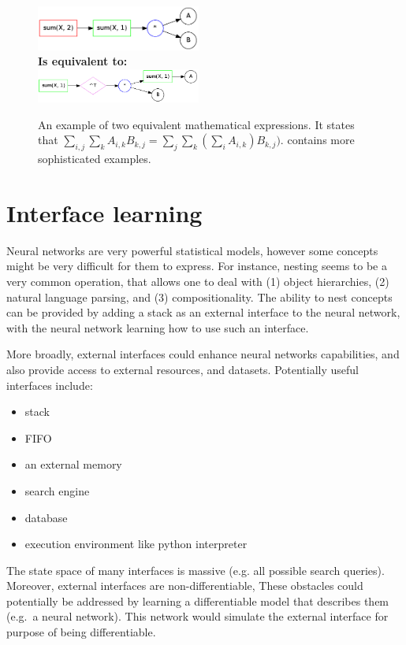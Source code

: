 \documentclass{article}
\begin{document}
\begin{figure}
  \centering
  \includegraphics[width=0.48\textwidth]{imgs/example1_brute.png}\\
  {\bf Is equivalent to:}\\
  \includegraphics[width=0.48\textwidth]{imgs/example1_opt.png}\\
  \caption{An example of two equivalent mathematical expressions. It states that
  $\sum_{i,j} \sum_k A_{i, k}B_{k, j} = \sum_{j} \sum_k (\sum_i A_{i,
    k})B_{k, j})$. \cite{zaremba2014learning} contains more sophisticated examples.}
  \label{fig:ident}
\end{figure}


\section{Interface learning}
\label{sec:interface}
Neural networks are very powerful statistical models, however some
concepts might be very difficult for them to express.  For instance,
nesting seems to be a very common operation, that allows one to deal
with (1) object hierarchies, (2) natural language parsing, and (3)
compositionality. The ability to nest concepts can be provided by
adding a stack as an external interface to the neural network, with
the neural network learning how to use such an interface.

More broadly, external interfaces could enhance neural networks capabilities, and also provide
access to external resources, and datasets. Potentially useful
interfaces include:
\begin{itemize}
  \item stack
  \item FIFO
  \item an external memory \cite{weston2014memory, graves2014neural}
  \item search engine
  \item database
  \item execution environment like python interpreter
\end{itemize}

The state space of many interfaces is massive (e.g. all possible search queries).
Moreover, external interfaces are non-differentiable, 
These obstacles could potentially be addressed by learning a differentiable 
model that describes them (e.g.~a neural network). This network would simulate the
external interface for purpose of being differentiable. 
\end{document}
